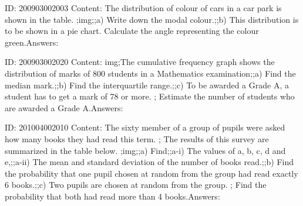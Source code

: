 \documentclass{article}
\begin{document}
ID: 200903002003
Content:
The distribution of colour of cars in a car park is shown in the table. ;img;;a) Write down the modal colour.;;b) This distribution is to be shown in a pie chart. Calculate the angle representing the colour green.Answers:

ID: 200903002020
Content:
img;The cumulative frequency graph shows the distribution of marks of 800 students in a Mathematics examination;;a) Find the median mark.;;b) Find the interquartile range.;;c) To be awarded a Grade A, a student has to get a mark of 78 or more. ; Estimate the number of students who are awarded a Grade A.Answers:

ID: 201004002010
Content:
The sixty member of a group of pupils were asked how many books they had read this term. ; The results of this survey are summarized in the table below. ;img;;a) Find;;a-i) The values of a, b, c, d and e,;;a-ii) The mean and standard deviation of the number of books read.;;b) Find the probability that one pupil chosen at random from the group had read exactly 6 books.;;c) Two pupils are chosen at random from the group. ; Find the probability that both had read more than 4 books.Answers:
\end{document}
